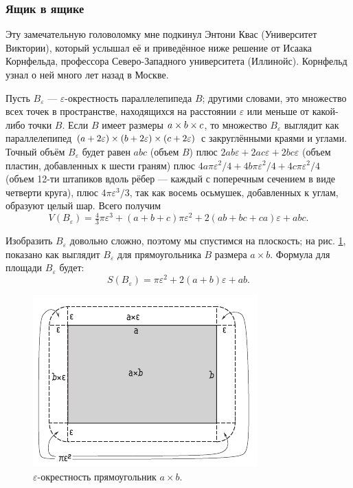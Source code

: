 \subsubsection*{Ящик в ящике}

Эту замечательную головоломку мне подкинул Энтони Квас (Университет Виктории), который услышал её и приведённое ниже решение от Исаака Корнфельда, профессора Северо-Западного университета (Иллинойс).
Корнфельд узнал о ней много лет назад в Москве.

Пусть $B_\varepsilon$ --- $\varepsilon$-окрестность параллелепипеда $B$;
другими словами, это множество всех точек в пространстве, находящихся на расстоянии $\varepsilon$ или меньше от какой-либо точки $B$.
Если $B$ имеет размеры $a \z\times b \z\times c$, то множество $B_\varepsilon$ выглядит как параллелепипед $(a + 2\varepsilon) \z\times (b + 2\varepsilon) \z\times (c + 2\varepsilon)$ с закруглёнными краями и углами.
Точный объём $B_\varepsilon$ будет равен
$abc$ (объем $B$)
плюс $2ab\varepsilon + 2ac\varepsilon + 2bc\varepsilon$ (объем пластин, добавленных к шести граням)
плюс $4a\pi\varepsilon^2 /4 + 4b\pi\varepsilon^2 /4 + 4c\pi\varepsilon^2 /4$ (объем 12-ти штапиков вдоль рёбер --- каждый с поперечным сечением в виде четверти круга),
плюс $4\pi\varepsilon^3 /3$, так как восемь осьмушек, добавленных к углам, образуют целый шар.
Всего получим
\[V(B_\varepsilon)=\tfrac43\pi\varepsilon^3+(a+b+c)\pi\varepsilon^2+2(ab+bc+ca)\varepsilon+abc.\]

Изобразить $B_\varepsilon$ довольно сложно, поэтому мы спустимся на плоскость;
на рис. \ref{pic:box}, показано как выглядит $B_\varepsilon$ для прямоугольника $B$ размера $a \times b$.
Формула для площади $B_\varepsilon$ будет:
\[S(B_\varepsilon)=\pi\varepsilon^2+2(a+b)\varepsilon+ab.\]

\begin{figure}[ht!]
\centering
\includegraphics[scale=1]{pics/box}
\caption{$\varepsilon$-окрестность прямоугольник $a \times b$.}
\label{pic:box}
\end{figure}

